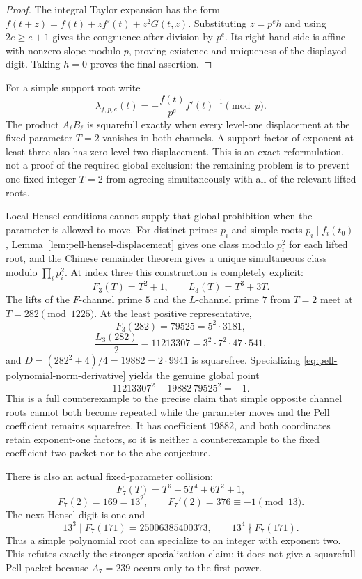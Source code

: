 \begin{proof}
The integral Taylor expansion has the form
$f(t+z)=f(t)+zf'(t)+z^2G(t,z)$.  Substituting $z=p^eh$ and using
$2e\ge e+1$ gives the congruence after division by $p^e$.  Its right-hand
side is affine with nonzero slope modulo $p$, proving existence and
uniqueness of the displayed digit.  Taking $h=0$ proves the final assertion.
\end{proof}

For a simple support root write
\[
 \lambda_{f,p,e}(t)=
 -\frac{f(t)}{p^e}f'(t)^{-1}\pmod p.
\]
The product $A_\ell B_\ell$ is squarefull exactly when every level-one
displacement at the fixed parameter $T=2$ vanishes in both channels.  A
support factor of exponent at least three also has zero level-two
displacement.  This is an exact reformulation, not a proof of the required
global exclusion: the remaining problem is to prevent one fixed integer
$T=2$ from agreeing simultaneously with all of the relevant lifted roots.

Local Hensel conditions cannot supply that global prohibition when the
parameter is allowed to move.  For distinct primes $p_i$ and simple roots
$p_i\mid f_i(t_0)$, Lemma~\ref{lem:pell-hensel-displacement} gives one class
modulo $p_i^2$ for each lifted root, and the Chinese remainder theorem gives
a unique simultaneous class modulo $\prod_i p_i^2$.  At index three this
construction is completely explicit:
\[
 F_3(T)=T^2+1,\qquad L_3(T)=T^3+3T.
\]
The lifts of the $F$-channel prime $5$ and the $L$-channel prime $7$ from
$T=2$ meet at $T=282\pmod{1225}$.  At the least positive representative,
\[
 F_3(282)=79525=5^2\cdot3181,
\]
\[
 \frac{L_3(282)}2=11213307
 =3^2\cdot7^2\cdot47\cdot541,
\]
and $D=(282^2+4)/4=19882=2\cdot9941$ is squarefree.  Specializing
\eqref{eq:pell-polynomial-norm-derivative} yields the genuine global point
\[
 11213307^2-19882\,79525^2=-1.
\]
This is a full counterexample to the precise claim that simple opposite
channel roots cannot both become repeated while the parameter moves and the
Pell coefficient remains squarefree.  It has coefficient $19882$, and both
coordinates retain exponent-one factors, so it is neither a counterexample
to the fixed coefficient-two packet nor to the abc conjecture.

There is also an actual fixed-parameter collision:
\[
 F_7(T)=T^6+5T^4+6T^2+1,
\]
\[
 F_7(2)=169=13^2,
 \qquad F_7'(2)=376\equiv-1\pmod{13}.
\]
The next Hensel digit is one and
\[
 13^3\mid F_7(171)=25006385400373,
 \qquad 13^4\nmid F_7(171).
\]
Thus a simple polynomial root can specialize to an integer with exponent
two.  This refutes exactly the stronger specialization claim; it does not
give a squarefull Pell packet because $A_7=239$ occurs only to the first
power.

